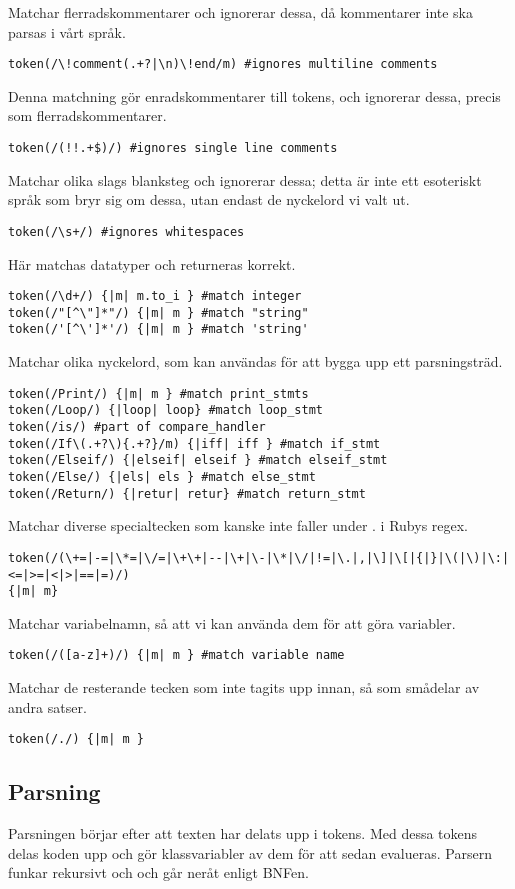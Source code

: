 \documentclass{TDP003mall}
\begin{document}
{Matchar flerradskommentarer och ignorerar dessa, då kommentarer inte ska parsas i vårt språk.
\begin{lstlisting}
token(/\!comment(.+?|\n)\!end/m) #ignores multiline comments
\end{lstlisting}
Denna matchning gör enradskommentarer till tokens, och ignorerar dessa, precis som flerradskommentarer.
\begin{lstlisting}
token(/(!!.+$)/) #ignores single line comments
\end{lstlisting}
Matchar olika slags blanksteg och ignorerar dessa; detta är inte ett esoteriskt språk som bryr sig om dessa, utan endast de nyckelord vi valt ut.

\begin{lstlisting}
token(/\s+/) #ignores whitespaces
\end{lstlisting}

Här matchas datatyper och returneras korrekt.
\begin{lstlisting}
token(/\d+/) {|m| m.to_i } #match integer
token(/"[^\"]*"/) {|m| m } #match "string"
token(/'[^\']*'/) {|m| m } #match 'string'
\end{lstlisting}
Matchar olika nyckelord, som kan användas för att bygga upp ett parsningsträd.
\begin{lstlisting}
token(/Print/) {|m| m } #match print_stmts
token(/Loop/) {|loop| loop} #match loop_stmt
token(/is/) #part of compare_handler
token(/If\(.+?\){.+?}/m) {|iff| iff } #match if_stmt
token(/Elseif/) {|elseif| elseif } #match elseif_stmt
token(/Else/) {|els| els } #match else_stmt
token(/Return/) {|retur| retur} #match return_stmt
\end{lstlisting}
Matchar diverse specialtecken som kanske inte faller under . i Rubys regex. 
\begin{lstlisting}
token(/(\+=|-=|\*=|\/=|\+\+|--|\+|\-|\*|\/|!=|\.|,|\]|\[|{|}|\(|\)|\:|<=|>=|<|>|==|=)/)
{|m| m}
\end{lstlisting}
Matchar variabelnamn, så att vi kan använda dem för att göra variabler.
\begin{lstlisting}
token(/([a-z]+)/) {|m| m } #match variable name
\end{lstlisting}
Matchar de resterande tecken som inte tagits upp innan, så som smådelar av andra satser.
\begin{lstlisting}
token(/./) {|m| m }
\end{lstlisting}
\subsection{Parsning}
Parsningen börjar efter att texten har delats upp i tokens. Med dessa tokens delas koden upp och gör klassvariabler av dem för att sedan evalueras. Parsern funkar rekursivt och och går neråt enligt BNFen.
}
\end{document}
